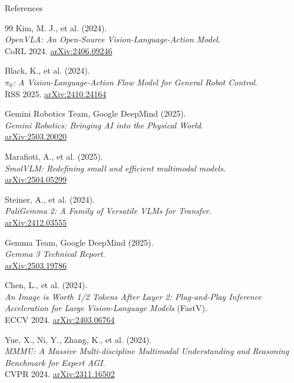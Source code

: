 \begin{frame}[allowframebreaks]{References}
\begin{thebibliography}{99}
      Kim, M. J., et al. (2024). \\
      \emph{OpenVLA: An Open-Source Vision-Language-Action Model}.\\
      CoRL 2024. \href{https://arxiv.org/abs/2406.09246}{arXiv:2406.09246}

      Black, K., et al. (2024). \\
      \emph{$\pi_0$: A Vision-Language-Action Flow Model for General Robot Control}.\\
      RSS 2025. \href{https://arxiv.org/abs/2410.24164}{arXiv:2410.24164}

      Gemini Robotics Team, Google DeepMind (2025). \\
      \emph{Gemini Robotics: Bringing AI into the Physical World}.\\
      \href{https://arxiv.org/abs/2503.20020}{arXiv:2503.20020}

      Marafioti, A., et al. (2025). \\
      \emph{SmolVLM: Redefining small and efficient multimodal models}.\\
      \href{https://arxiv.org/abs/2504.05299}{arXiv:2504.05299}

      Steiner, A., et al. (2024). \\
      \emph{PaliGemma 2: A Family of Versatile VLMs for Transfer}.\\
      \href{https://arxiv.org/abs/2412.03555}{arXiv:2412.03555}

      Gemma Team, Google DeepMind (2025). \\
      \emph{Gemma 3 Technical Report}.\\
      \href{https://arxiv.org/abs/2503.19786}{arXiv:2503.19786}

      Chen, L., et al. (2024). \\
      \emph{An Image is Worth 1/2 Tokens After Layer 2: Plug-and-Play Inference Acceleration for Large Vision-Language Models} (FastV).\\
      ECCV 2024. \href{https://arxiv.org/abs/2403.06764}{arXiv:2403.06764}

      Yue, X., Ni, Y., Zhang, K., et al. (2024). \\
      \emph{MMMU: A Massive Multi-discipline Multimodal Understanding and Reasoning Benchmark for Expert AGI}.\\
      CVPR 2024. \href{https://arxiv.org/abs/2311.16502}{arXiv:2311.16502}


\end{thebibliography}
\end{frame}
